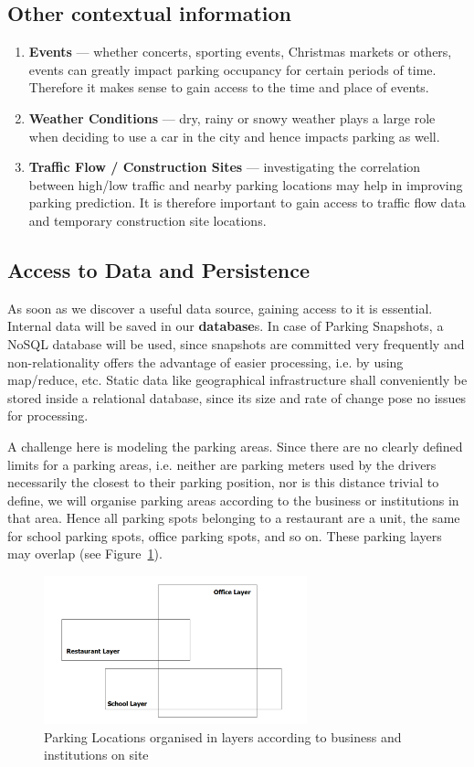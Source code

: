\documentclass{article}
\begin{document}
\subsection{Other contextual information}
\label{other-context-info}
\begin{enumerate}
\item \textbf{Events} --- whether concerts, sporting events, Christmas markets or others, events can greatly impact parking occupancy for certain periods of time. Therefore it makes sense to gain access to the time and place of events.
\item \textbf{Weather Conditions} --- dry, rainy or snowy weather plays a large role when deciding to use a car in the city and hence impacts parking as well.
\item \textbf{Traffic Flow / Construction Sites} --- investigating the correlation between high/low traffic and nearby parking locations may help in improving parking prediction. It is therefore important to gain access to traffic flow data and temporary construction site locations.
\end{enumerate}

\subsection{Access to Data and Persistence}
\label{sec:access-to-data}
As soon as we discover a useful data source, gaining access to it is essential. Internal data will be saved in our \textbf{database}s. In case of Parking Snapshots, a NoSQL database will be used, since snapshots are committed very frequently and non-relationality offers the advantage of easier processing, i.e. by using map/reduce, etc. Static data like geographical infrastructure shall conveniently be stored inside a relational database, since its size and rate of change pose no issues for processing.

A challenge here is modeling the parking areas. Since there are no clearly defined limits for a parking areas, i.e. neither are parking meters used by the drivers necessarily the closest to their parking position, nor is this distance trivial to define, we will organise parking areas according to the business or institutions in that area. Hence all parking spots belonging to a restaurant are a unit, the same for school parking spots, office parking spots, and so on. These parking layers may overlap (see Figure~\ref{fig:parking-layers}).

\begin{figure}[!ht]
    \centering
    \includegraphics[width=3.0in]{ParkingLayers}
    \caption{Parking Locations organised in layers according to business and institutions on site}
    \label{fig:parking-layers}
\end{figure}
\end{document}
